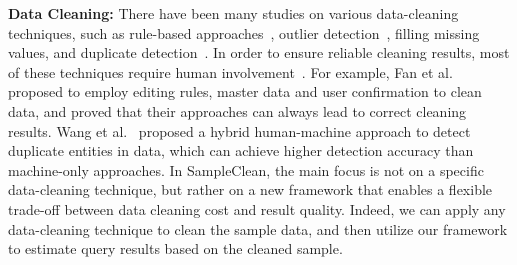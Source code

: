 {\noindent \bf Data Cleaning:} There have been many studies on various data-cleaning techniques, such as rule-based approaches~\cite{fan2012foundations,DBLP:conf/sigmod/DallachiesaEEEIOT13}, outlier detection~\cite{hellerstein2008quantitative,dasu2003exploratory}, filling missing values, and duplicate detection~\cite{conf/hdkm/Christen08, DBLP:conf/kdd/BilenkoM03, conf/sigmod/WangLF12}. In order to ensure reliable cleaning results, most of these techniques require human involvement~\cite{DBLP:conf/sigmod/JefferyFH08,DBLP:journals/pvldb/FanLMTY10,DBLP:journals/pvldb/YakoutENOI11,DBLP:journals/pvldb/WangKFF12,DBLP:conf/sigmod/WangLKFF13}. 
For example, Fan et al.~\cite{DBLP:journals/pvldb/FanLMTY10} proposed to employ editing rules, master data and user confirmation to clean data, and proved that their approaches can always lead to correct cleaning results. Wang et al.~\cite{DBLP:journals/pvldb/WangKFF12} proposed a hybrid human-machine approach to detect duplicate entities in data, which can achieve higher detection accuracy than machine-only approaches. 
In SampleClean, the main focus is not on a specific data-cleaning technique, but rather on a new framework that enables a flexible trade-off between data cleaning cost and result quality.
Indeed, we can apply any data-cleaning technique to clean the sample data, and then utilize our framework to estimate query results based on the cleaned sample. 

\vspace{.5em}

